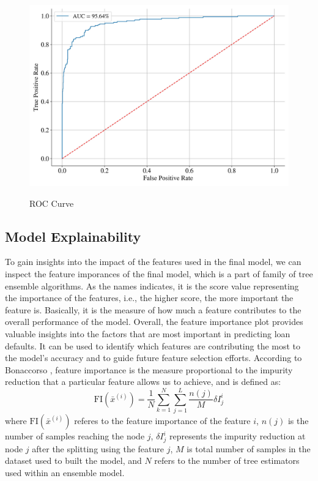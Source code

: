 \begin{figure}[H]
\centering
\caption{ROC Curve}\vspace{0.5em}
\label{fig:roc}\
\includegraphics[width=140mm]{Figures/ROC_curve_FINAL.jpg}
\vspace{-1em}
\end{figure}

\subsection{Model Explainability}
To gain insights into the impact of the features used in the final model, we can inspect the feature imporances of the final model, which is a part of family of tree ensemble algorithms.
As the names indicates, it is the score value representing the importance of the features, i.e., the higher score, the more important the feature is. Basically, it is the measure of how much a feature contributes to the overall performance of the model.
Overall, the feature importance plot provides valuable insights into the factors that are most important in predicting loan defaults. It can be used to identify which features are contributing the most to the model's accuracy and to guide future feature selection efforts.
According to Bonaccorso \citep{bonaccorso2020mastering}, feature importance is the measure proportional to the impurity reduction that a particular feature allows us to achieve, and is defined as:
\begin{equation}\label{eq}
    \text{FI}\left(\bar{x}^{\left(i\right)}\right) = \frac{1}{N} \displaystyle\sum_{k=1}^{N} \displaystyle\sum_{j=1}^{L} \frac{n(j)}{M} \delta I_{j}^{i}
\end{equation}
where $ \text{FI}\left(\bar{x}^{\left(i\right)}\right)$ referes to the feature importance of the feature $i$, $n(j)$ is the number of samples reaching the node $j$, $\delta I_{j}^{i}$ represents the impurity reduction at node $j$ after the splitting using the feature $j$, $M$ is total number of samples in the dataset used to built the model, and $N$ refers to the number of tree estimators used within an ensemble model.

